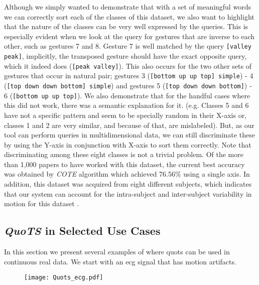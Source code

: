 Although we simply wanted to demonstrate that with a set of meaningful words we can correctly sort each of the classes of this dataset, we also want to highlight that the nature of the classes can be very well expressed by the queries. This is especially evident when we look at the query for gestures that are inverse to each other, such as gestures 7 and 8. Gesture 7 is well matched by the query \texttt{[valley peak]}, implicitly, the transposed gesture should have the exact opposite query, which it indeed does (\texttt{[peak valley]}). This also occurs for the two other sets of gestures that occur in natural pair; gestures 3 (\texttt{[bottom up up top] simple}) - 4 (\texttt{[top down down bottom] simple}) and gestures  5 (\texttt{[top down down bottom]}) - 6 (\texttt{[bottom up up top]}).
We also demonstrate that for the handful cases where this did not work, there was a semantic explanation for it. (e.g. Classes 5 and 6 have not a specific pattern and seem to be specially random in their X-axis or, classes 1 and 2 are very similar, and because of that, are mislabeled). But, as our tool can perform queries in multidimensional data, we can still  discriminate these by using the Y-axis in conjunction with X-axis to sort them correctly. 
Note that discriminating among these eight classes is not a trivial problem. Of the more than 1,000 papers to have worked with this dataset, the current best accuracy was obtained by \textit{COTE} algorithm which achieved 76.56\% using a single axis. In addition, this dataset was acquired from eight different subjects, which indicates that our system can account for the intra-subject and inter-subject variability in motion for this dataset \cite{uWave}.

\subsection{\textit{QuoTS} in Selected Use Cases}

In this section we present several examples of where \gls{quots} can be used in continuous real data. We start with an \gls{ecg} signal that has motion artifacts.

\begin{figure}
\texttt{[image: Quots\_ecg.pdf]}
\end{figure}

